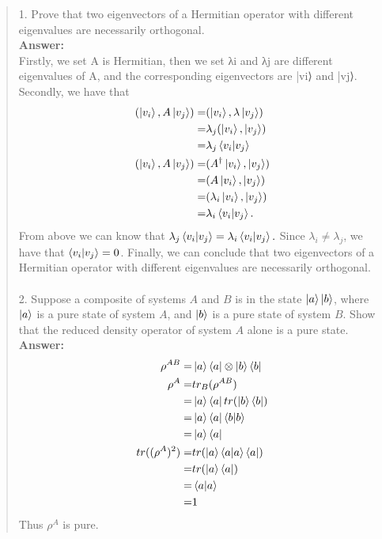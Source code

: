 \documentclass[UTF8]{ctexart}
\begin{document}
\begin{quote}
1. Prove that two eigenvectors of a Hermitian operator with different eigenvalues are necessarily orthogonal.\\
\textbf{Answer:}\\
Firstly, we set A is Hermitian, then we set λi and λj are different eigenvalues of A, and the corresponding eigenvectors are |vi⟩ and |vj⟩.
Secondly, we have that 
\begin{equation}
	\begin{aligned}
	(\ket{v_{i}},A\ket{v_{j}})=&(\ket{v_{i}},\lambda \ket{v_{j}})\\
	=&\lambda_{j}  (\ket{v_{i}},\ket{v_{j}}) \\
	=&\lambda_{j} \bra{v_{i}}\ket{v_{j}}\\
	(\ket{v_{i}},A\ket{v_{j}})=&(A^{\dagger}\ket{v_{i}},\ket{v_{j}})\\
	=&(A\ket{v_{i}},\ket{v_{j}})\\
	=& (\lambda_{i}\ket{v_{i}},\ket{v_{j}}) \\
	=&\lambda_{i} \bra{v_{i}}\ket{v_{j}}.\\
	\end{aligned}
\end{equation}
From above we can know that $ \lambda_{j} \bra{v_{i}}\ket{v_{j}}=\lambda_{i} \bra{v_{i}}\ket{v_{j}}.$
Since $\lambda_{i} \neq \lambda_{j}  $, we have that $ \bra{v_{i}}\ket{v_{j}}= 0$. Finally, we can conclude that two eigenvectors of a Hermitian operator with different eigenvalues are necessarily orthogonal.
\\
\\
2. Suppose a composite of systems $A$ and $B$ is in the state $\ket{a}\ket{b}$, 
where $\ket{a}$ is a pure state of system $A$, and $\ket{b} $ is a pure state of system $B$. 
Show that the reduced density operator of system $A$ alone is a pure state.\\
\textbf{Answer:}\\
\begin{equation}
	\begin{aligned}
		\rho^{AB}=&\ket{a}\bra{a}\otimes \ket{b}\bra{b} \\
		 \rho^{A}=&tr_{B}(\rho^{AB}) \\
				  =&\ket{a}\bra{a}tr(\ket{b}\bra{b}) \\
				  =&\ket{a}\bra{a}\bra{b}\ket{b} \\
				  =&\ket{a}\bra{a} \\
 tr( (\rho^{A})^{2})=&tr(\ket{a}\bra{a}\ket{a}\bra{a}) \\
				  =&tr(\ket{a}\bra{a})\\
				  =&\bra{a}\ket{a} \\
				  =&1 \\
	\end{aligned}
\end{equation}
Thus $\rho^{A}$ is pure.
	\end{quote}
\end{document}
